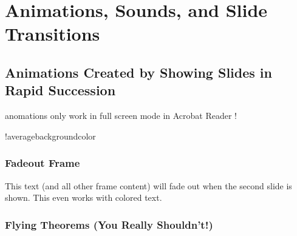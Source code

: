 \section{Animations, Sounds, and Slide Transitions}
\subsection{Animations Created by Showing Slides in Rapid Succession}
\newcount\opaqueness
\begin{frame}
  anomations only work in full screen mode in Acrobat Reader !
  \begin{colormixin}{\the\opaqueness!averagebackgroundcolor}
    \frametitle{Fadeout Frame}
    This text (and all other frame content) will fade out when the
    second slide is shown. This even works with
    {\color{green!90!black}colored} \alert{text}.
  \end{colormixin}
\end{frame}
\newcount\opaqueness
\newdimen\offset
\begin{frame}
  \frametitle{Flying Theorems (You Really Shouldn't!)}
\end{frame}
